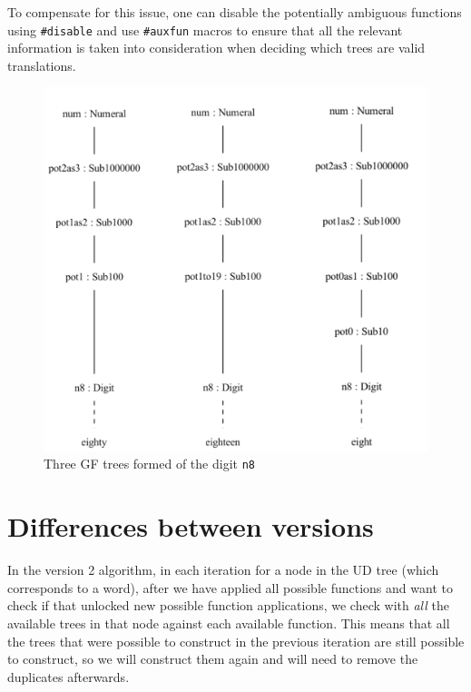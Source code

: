 To compensate for this issue, one can disable the potentially ambiguous functions using \verb|#disable| and use \verb|#auxfun| macros to ensure that all the relevant information is taken into consideration when deciding which trees are valid translations.

\begin{figure}
    \centering
\includegraphics[scale=0.5]{thesis/figure/eight_eighteen_eighty.png}
    \caption{Three GF trees formed of the digit \texttt{n8}}
    \label{fig:eight}
\end{figure}

\section{Differences between versions}

In the version 2 algorithm, in each iteration for a node in the UD tree (which corresponds to a word), after we have applied all possible functions and want to check if that unlocked new possible function applications, we check with \emph{all} the available trees in that node against each available function. This means that all the trees that were possible to construct in the previous iteration are still possible to construct, so we will construct them again and will need to remove the duplicates afterwards.


